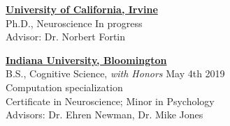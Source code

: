 \documentclass[10pt]{article}
\begin{document}
\href{http://www.uci.edu/}{\textbf{University of California, Irvine}} \\
Ph.D., Neuroscience \hfill In progress\\
Advisor: Dr. Norbert Fortin

\vspace{1\baselineskip}

\href{http://www.iu.edu/}{\textbf{Indiana University, Bloomington}} \\
B.S., Cognitive Science, \textit{with Honors} \hfill May 4th 2019 \\
Computation specialization \\
Certificate in Neuroscience; Minor in Psychology\\
Advisors: Dr. Ehren Newman, Dr. Mike Jones

\end{document}
